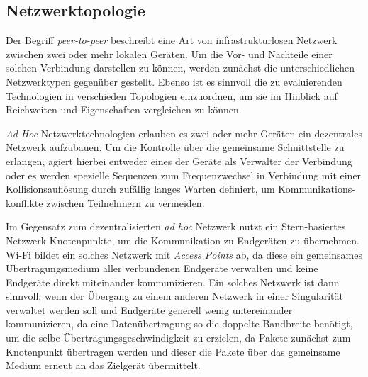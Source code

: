     
    
    \subsection{Netzwerktopologie}
    
    Der Begriff {\it peer-to-peer} beschreibt eine Art von infrastrukturlosen Netzwerk zwischen zwei oder mehr lokalen Geräten. Um die Vor- und Nachteile einer solchen Verbindung darstellen zu können, werden zunächst die unterschiedlichen Netzwerktypen gegenüber gestellt. Ebenso ist es sinnvoll die zu evaluierenden Technologien in verschieden Topologien einzuordnen, um sie im Hinblick auf Reichweiten und Eigenschaften vergleichen zu können.
    
    {\it Ad Hoc} Netzwerktechnologien erlauben es zwei oder mehr Geräten ein dezentrales Netzwerk aufzubauen. Um die Kontrolle über die gemeinsame Schnittstelle zu erlangen, agiert hierbei entweder eines der Geräte als Verwalter der Verbindung oder es werden spezielle Sequenzen zum Frequenzwechsel in Verbindung mit einer Kollisionsauflösung durch zufällig langes Warten definiert, um Kommunikations-\linebreak konflikte zwischen Teilnehmern zu vermeiden.
    
    Im Gegensatz zum dezentralisierten {\it ad hoc} Netzwerk nutzt ein Stern-basiertes Netzwerk Knotenpunkte, um die Kommunikation zu Endgeräten zu übernehmen. Wi-Fi bildet ein solches Netzwerk mit {\it Access Points} ab, da diese ein gemeinsames Übertragungsmedium aller verbundenen Endgeräte verwalten und keine Endgeräte direkt miteinander kommunizieren. Ein solches Netzwerk ist dann sinnvoll, wenn der Übergang zu einem anderen Netzwerk in einer Singularität verwaltet werden soll und Endgeräte generell wenig untereinander kommunizieren, da eine Datenübertragung so die doppelte Bandbreite benötigt, um die selbe Übertragungsgeschwindigkeit zu erzielen, da Pakete zunächst zum Knotenpunkt übertragen werden und dieser die Pakete über das gemeinsame Medium erneut an das Zielgerät übermittelt.

